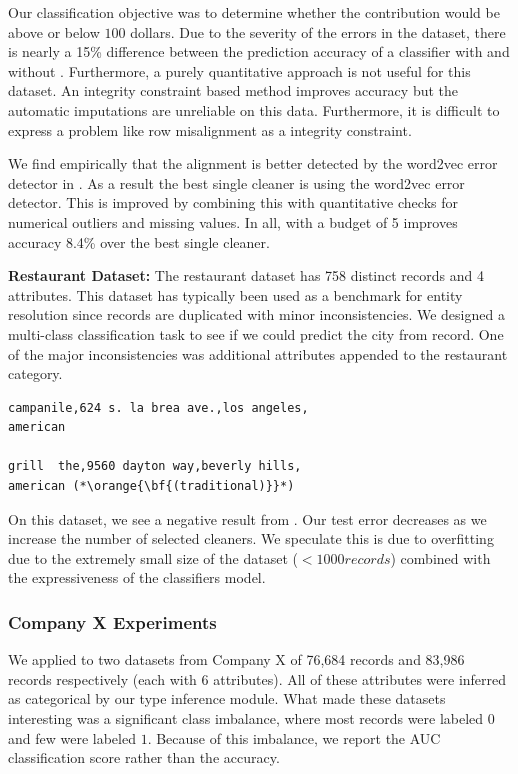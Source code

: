 Our classification objective was to determine whether the contribution would be above or below $100$ dollars. Due to the severity of the errors in the dataset, there is nearly a 15\% difference between the prediction accuracy of a classifier with and without \sys.
Furthermore, a purely quantitative approach is not useful for this dataset.
An integrity constraint based method improves accuracy but the automatic imputations are unreliable on this data.
Furthermore, it is difficult to express a problem like row misalignment as a integrity constraint.

We find empirically that the alignment is better detected by the word2vec error detector in \sys.
As a result the best single cleaner is using the word2vec error detector.
This is improved by combining this with quantitative checks for numerical outliers and missing values.
In all, \sys with a budget of 5 improves accuracy 8.4\% over the best single cleaner. 

\vspace{0.5em}\noindent\textbf{Restaurant Dataset: } The restaurant dataset has 758 distinct records and 4 attributes. This dataset has typically been used as a benchmark for entity resolution since records are duplicated with minor inconsistencies.
We designed a multi-class classification task to see if we could predict the city from record.
One of the major inconsistencies was additional attributes appended to the restaurant category.

\begin{lstlisting}
campanile,624 s. la brea ave.,los angeles,
american

grill  the,9560 dayton way,beverly hills,
american (*\orange{\bf{(traditional)}}*)
\end{lstlisting}

On this dataset, we see a negative result from \sys. Our test error decreases as we increase the number of selected cleaners. We speculate this is due to overfitting due to the extremely small size of the dataset  ($<1000 records$) combined with the expressiveness of the classifiers model.

\subsubsection{Company X Experiments}
We applied \sys to two datasets from Company X of 76,684 records and 83,986 records respectively (each with 6 attributes). 
All of these attributes were inferred as categorical by our type inference module.
What made these datasets interesting was a significant class imbalance, where most records were labeled $0$ and few were labeled $1$.
Because of this imbalance, we report the AUC classification score rather than the accuracy.

